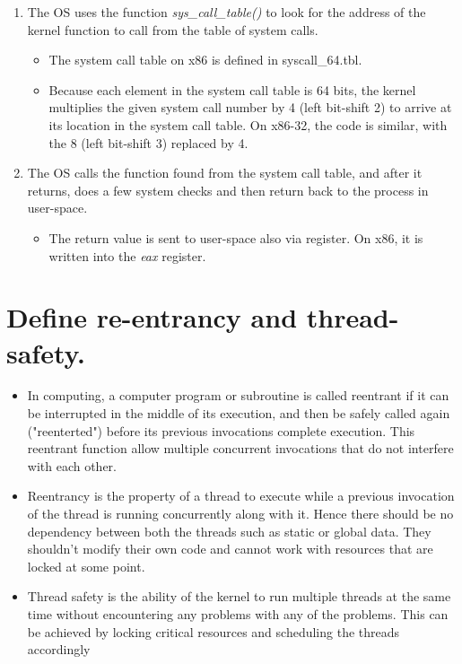 \documentclass[letterpaper,10pt]{article}
\begin{document}
\begin{enumerate}
\begin{itemize}
	\end{itemize}
	\item The OS uses the function \textit{sys\_call\_table()} to look for the address of the kernel function to call from the table of system calls.
	\begin{itemize}
		\item The system call table on x86 is defined in syscall\_64.tbl.
		\item Because each element in the system call table is 64 bits, the kernel multiplies the given system call number by 4 (left bit-shift 2) to arrive at its location in the system call table. On x86-32, the code is similar, with the 8 (left bit-shift 3) replaced by 4.
	\end{itemize}
	\item The OS calls the function found from the system call table, and after it returns, does a few system checks and then return back to the process in user-space.
	\begin{itemize}
		\item The return value is sent to user-space also via register. On x86, it is written into the \textit{eax} register.
	\end{itemize}
\end{enumerate}

\section{Define re-entrancy and thread-safety.}

\begin{itemize}
\item In computing, a computer program or subroutine is called reentrant if it can be interrupted in the middle of its execution, and then be safely called again ("reenterted") before its previous invocations complete execution. This reentrant function allow multiple concurrent invocations that do not interfere with each other. 

\item Reentrancy is the property of a thread to execute while a previous invocation of the thread is running concurrently along with it. Hence there should be no dependency between both the threads such as static or global data. They shouldn’t modify their own code and cannot work with resources that are locked at some point. 

\item Thread safety is the ability of the kernel to run multiple threads at the same time without encountering any problems with any of the problems. This can be achieved by locking critical resources and scheduling the threads accordingly 

\end{itemize}
\end{document}
